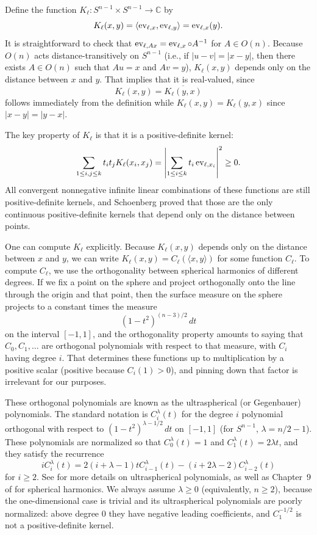 \documentclass{jams-l}
\theoremstyle{plain}
\numberwithin{theorem}{section}
\theoremstyle{definition}
\numberwithin{equation}{section}
\newcommand{\C}{{\mathbb C}}
\newcommand{\ev}{\mathop{\textup{ev}}\nolimits}
\newcommand{\co}{\colon}
\begin{document}
Define the function $K_\ell \co S^{n-1} \times S^{n-1} \to \C$ by
$$
K_\ell(x,y) = \langle \ev_{\ell,x}, \ev_{\ell,y} \rangle =
\ev_{\ell,x}(y).
$$
It is straightforward to check that $\ev_{\ell,Ax} = \ev_{\ell,x}
\circ A^{-1}$ for $A \in O(n)$.  Because $O(n)$ acts
distance-transitively on $S^{n-1}$ (i.e., if $|u-v|=|x-y|$, then
there exists $A \in O(n)$ such that $Au=x$ and $Av=y$),
$K_\ell(x,y)$ depends only on the distance between $x$ and $y$.
That implies that it is real-valued, since
$$
K_\ell(x,y) = \overline{K_\ell(y,x)}
$$
follows immediately from the definition while $K_\ell(x,y) =
K_\ell(y,x)$ since $|x-y|=|y-x|$.

The key property of $K_\ell$ is that it is a positive-definite
kernel:
$$
\sum_{1 \le i,j \le k} t_i t_j K_\ell(x_i,x_j) = \left|\sum_{1 \le
i \le k} t_i \ev_{\ell,x_i}\right|^2 \ge 0.
$$
All convergent nonnegative infinite linear combinations of these
functions are still positive-definite kernels, and Schoenberg
proved that those are the only continuous positive-definite
kernels that depend only on the distance between points.

One can compute $K_\ell$ explicitly.  Because $K_\ell(x,y)$
depends only on the distance between $x$ and $y$, we can write
$K_\ell(x,y) = C_\ell(\langle x,y \rangle)$ for some function
$C_\ell$.  To compute $C_\ell$, we use the orthogonality between
spherical harmonics of different degrees. If we fix a point on the
sphere and project orthogonally onto the line through the origin
and that point, then the surface measure on the sphere projects to
a constant times the measure
$$
(1-t^2)^{(n-3)/2} \, dt
$$
on the interval $[-1,1]$, and the orthogonality property amounts
to saying that $C_0,C_1,\dots$ are orthogonal polynomials with
respect to that measure, with $C_i$ having degree $i$. That
determines these functions up to multiplication by a positive
scalar (positive because $C_i(1) > 0$), and pinning down that
factor is irrelevant for our purposes.

These orthogonal polynomials are known as the ultraspherical (or
Gegenbauer) polynomials.  The standard notation is
$C_i^\lambda(t)$ for the degree $i$ polynomial orthogonal with
respect to $(1-t^2)^{\lambda-1/2}\, dt$ on $[-1,1]$ (for
$S^{n-1}$, $\lambda = n/2-1$). These polynomials are normalized so
that $C_0^\lambda(t)=1$ and $C_1^\lambda(t) = 2\lambda t$, and
they satisfy the recurrence
$$
i C^\lambda_i(t) = 2(i+\lambda-1)t C^\lambda_{i-1}(t) -
(i+2\lambda-2)C^\lambda_{i-2}(t)
$$
for $i \ge 2$.  See \cite[p.~303]{AAR} for more details on
ultraspherical polynomials, as well as Chapter~9 of \cite{AAR} for
spherical harmonics.  We always assume $\lambda \ge 0$
(equivalently, $n \ge 2$), because the one-dimensional case is
trivial and its ultraspherical polynomials are poorly normalized:
above degree $0$ they have negative leading coefficients, and
$C_1^{-1/2}$ is not a positive-definite kernel.
\end{document}
